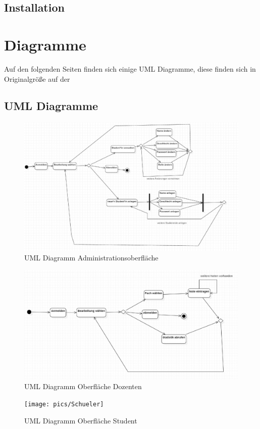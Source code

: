 \documentclass[12pt,a4paper,parskip]{scrreprt}
\begin{document}
\section{Installation}
\chapter{Diagramme}
Auf den folgenden Seiten finden sich einige UML Diagramme, diese finden sich in Originalgröße auf der 
\section{UML Diagramme}
\begin{figure}[!hbtp]%
\centering
\includegraphics[width=1\linewidth]{pics/AdminE}
\caption[Admin]{UML Diagramm Administrationsoberfläche}
\label{fig:AdminE}
\end{figure}
\begin{figure}[!hbtp]%
\centering
\includegraphics[width=1\linewidth]{pics/DozentIn}
\caption[Oberfläche Dozenten]{UML Diagramm Oberfläche Dozenten}
\label{fig:DozentIn}
\end{figure}
\begin{figure}
\centering
\texttt{[image: pics/Schueler]}
\caption[Oberfläche Student]{UML Diagramm Oberfläche Student}
\label{fig:Schueler}
\end{figure}
\end{document}
